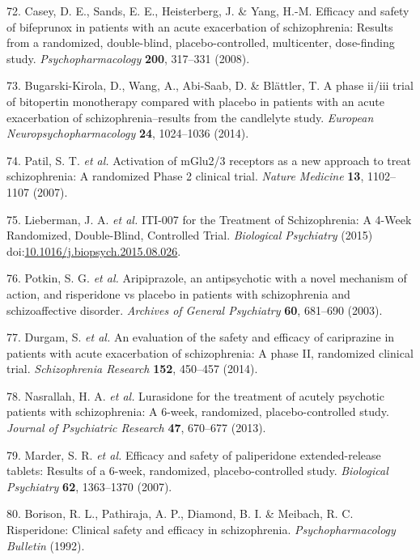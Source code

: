 \documentclass[9pt,english,,jou,floatsintext]{apa6}
\begin{document}
\hypertarget{ref-Casey2008}{}
72. Casey, D. E., Sands, E. E., Heisterberg, J. \& Yang, H.-M. Efficacy
and safety of bifeprunox in patients with an acute exacerbation of
schizophrenia: Results from a randomized, double-blind,
placebo-controlled, multicenter, dose-finding study.
\emph{Psychopharmacology} \textbf{200}, 317--331 (2008).

\hypertarget{ref-Bugarski2014}{}
73. Bugarski-Kirola, D., Wang, A., Abi-Saab, D. \& Blättler, T. A phase
ii/iii trial of bitopertin monotherapy compared with placebo in patients
with an acute exacerbation of schizophrenia--results from the candlelyte
study. \emph{European Neuropsychopharmacology} \textbf{24}, 1024--1036
(2014).

\hypertarget{ref-Patil2007}{}
74. Patil, S. T. \emph{et al.} Activation of mGlu2/3 receptors as a new
approach to treat schizophrenia: A randomized Phase 2 clinical trial.
\emph{Nature Medicine} \textbf{13}, 1102--1107 (2007).

\hypertarget{ref-Lieberman2015}{}
75. Lieberman, J. A. \emph{et al.} ITI-007 for the Treatment of
Schizophrenia: A 4-Week Randomized, Double-Blind, Controlled Trial.
\emph{Biological Psychiatry} (2015)
doi:\href{https://doi.org/10.1016/j.biopsych.2015.08.026}{10.1016/j.biopsych.2015.08.026}.

\hypertarget{ref-Potkin2003}{}
76. Potkin, S. G. \emph{et al.} Aripiprazole, an antipsychotic with a
novel mechanism of action, and risperidone vs placebo in patients with
schizophrenia and schizoaffective disorder. \emph{Archives of General
Psychiatry} \textbf{60}, 681--690 (2003).

\hypertarget{ref-Durgam2014}{}
77. Durgam, S. \emph{et al.} An evaluation of the safety and efficacy of
cariprazine in patients with acute exacerbation of schizophrenia: A
phase II, randomized clinical trial. \emph{Schizophrenia Research}
\textbf{152}, 450--457 (2014).

\hypertarget{ref-Nasrallah2013}{}
78. Nasrallah, H. A. \emph{et al.} Lurasidone for the treatment of
acutely psychotic patients with schizophrenia: A 6-week, randomized,
placebo-controlled study. \emph{Journal of Psychiatric Research}
\textbf{47}, 670--677 (2013).

\hypertarget{ref-Marder2007}{}
79. Marder, S. R. \emph{et al.} Efficacy and safety of paliperidone
extended-release tablets: Results of a 6-week, randomized,
placebo-controlled study. \emph{Biological Psychiatry} \textbf{62},
1363--1370 (2007).

\hypertarget{ref-Borison1992}{}
80. Borison, R. L., Pathiraja, A. P., Diamond, B. I. \& Meibach, R. C.
Risperidone: Clinical safety and efficacy in schizophrenia.
\emph{Psychopharmacology Bulletin} (1992).
\end{document}
